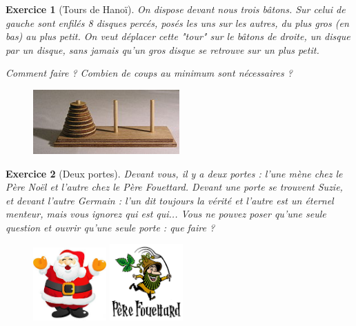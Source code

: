 \documentclass[12pt]{article}
\theoremstyle{break}
\newtheorem{exo}{Exercice}
\begin{document}
\begin{exo}[Tours de Hanoï]
On dispose devant nous trois bâtons. Sur celui de gauche sont enfilés 8 disques percés, posés les uns sur les autres, du plus gros (en bas) au plus petit. On veut déplacer cette "tour" sur le bâtons de droite, un disque par un disque, sans jamais qu'un gros disque se retrouve sur un plus petit.

Comment faire ? Combien de coups au minimum sont nécessaires ?

\begin{figure}[h!]
	\centering
    \includegraphics[width=0.5\textwidth]{TourDeHanoi.jpeg}
\end{figure}
\end{exo}


\begin{exo}[Deux portes]
Devant vous, il y a deux portes : l'une mène chez le Père Noël et l'autre chez le Père Fouettard. Devant une porte se trouvent Suzie, et devant l'autre Germain : l'un dit toujours la vérité et l'autre est un éternel menteur, mais vous ignorez qui est qui... Vous ne pouvez poser qu'une seule question et ouvrir qu'une seule porte : que faire ?

\begin{figure}[h!]
	\centering
    \includegraphics[width=0.25\textwidth]{PereNoel.jpg}
    \includegraphics[width=0.25\textwidth]{PereFouettard.png}
\end{figure}
\end{exo}
\end{document}
